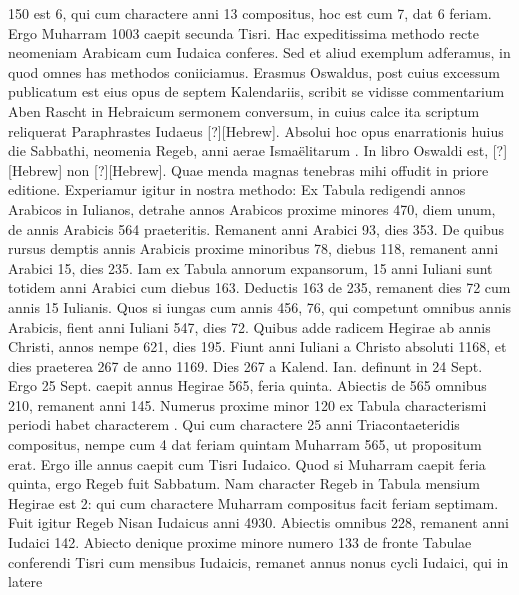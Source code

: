 150 est 6, qui cum charactere anni 13 compositus, hoc est cum 7, dat
6 feriam.
Ergo Muharram %
1003 caepit secunda Tisri.
Hac expeditissima
methodo recte neomeniam Arabicam cum Iudaica conferes.
Sed et
aliud exemplum adferamus, in quod omnes has methodos coniiciamus.
Erasmus Oswaldus, %
post cuius excessum publicatum est eius
opus de septem Kalendariis, scribit se vidisse commentarium Aben
Rascht in Hebraicum sermonem conversum, in cuius calce ita scriptum
reliquerat Paraphrastes Iudaeus \texthebrew{[?]}[Hebrew].
Absolui hoc
opus enarrationis huius die Sabbathi, neomenia Regeb, anni aerae Ismaëlitarum
. %
In libro Oswaldi est,
 \texthebrew{[?]}[Hebrew] non \texthebrew{[?]}[Hebrew].
Quae menda
magnas tenebras mihi offudit in priore editione.
Experiamur igitur
in nostra methodo: Ex Tabula redigendi annos Arabicos in Iulianos,
detrahe annos Arabicos proxime minores 470, diem unum,
de annis Arabicis 564 praeteritis.
Remanent anni Arabici 93, dies 353.
De quibus rursus demptis annis Arabicis proxime minoribus 78, diebus
118, remanent anni Arabici 15, dies 235.
Iam ex Tabula annorum expansorum,
15 anni Iuliani sunt totidem anni Arabici cum diebus 163.
Deductis 163 de 235, remanent dies 72 cum annis 15 Iulianis.
Quos
si iungas cum annis 456, 76, qui competunt omnibus annis Arabicis,
fient anni Iuliani 547, dies 72.
Quibus adde radicem
Hegirae ab annis Christi, annos nempe 621, dies 195.
Fiunt anni
Iuliani a Christo absoluti 1168, et dies praeterea 267 de anno
1169.
Dies 267 a Kalend. Ian. %
definunt in 24 Sept. %
Ergo 25 Sept. %
caepit annus Hegirae 565, feria quinta.
Abiectis de 565 omnibus
210, remanent anni 145.
Numerus proxime minor 120 ex Tabula
characterismi periodi habet characterem .
Qui cum charactere
25 anni Triacontaeteridis compositus, nempe cum 4 dat feriam
quintam Muharram 565, ut propositum erat.
Ergo ille annus caepit
cum Tisri Iudaico.
Quod si Muharram caepit feria quinta, ergo
Regeb fuit Sabbatum.
%
Nam character Regeb in Tabula mensium
Hegirae est 2: qui cum charactere Muharram compositus facit feriam
septimam.
Fuit igitur Regeb Nisan Iudaicus anni 4930.
Abiectis
omnibus 228, remanent anni Iudaici 142.
Abiecto denique proxime
minore numero 133 de fronte Tabulae conferendi Tisri cum
mensibus Iudaicis, remanet annus nonus cycli Iudaici, qui in latere
